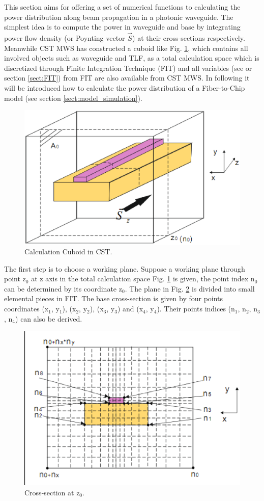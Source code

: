 
This section aims for offering a set of numerical functions to calculating the power distribution along beam propagation in a photonic waveguide. The simplest idea is to compute the power in waveguide and base by integrating power flow density (or Poynting vector $\vec{S}$) at their cross-sections respectively. Meanwhile CST MWS has constructed a cuboid like Fig. \ref{Afig:app_power_distribution01}, which contains all involved objects such as waveguide and TLF, as a total calculation space which is discretized through Finite Integration Technique (FIT) and all variables (see \cite{script_FeldSim} or section \ref{sect:FIT}) from FIT are also available from CST MWS. In following it will be introduced how to calculate the power distribution of a Fiber-to-Chip model (see section \ref{sect:model_simulation}). 
\begin{figure}[ht]
\centering
\includegraphics[width=0.7 \textwidth]{bilder/app_power_distribution01}
\caption{Calculation Cuboid in CST.}
\label{Afig:app_power_distribution01}
\end{figure}
The first step is to choose a working plane. Suppose a working plane through point z$_{0}$ at z axis in the total calculation space Fig. \ref{Afig:app_power_distribution01} is given, the point index n$_{0}$ can be determined by its coordinate z$_{0}$. The plane in Fig. \ref{Afig:app_power_distribution02} is divided into small elemental pieces in FIT. The base cross-section is given by four points coordinates (x$_{1}$, y$_{1}$), (x$_{2}$, y$_{2}$), (x$_{3}$, y$_{3}$) and (x$_{4}$, y$_{4}$). Their points indices (n$_{1}$, n$_{2}$, n$_{3}$, n$_{4}$) can also be derived.    
\begin{figure}[ht]
\centering
\includegraphics[width=0.7 \textwidth]{bilder/app_power_distribution02}
\caption{Cross-section at z$_{0}$.}
\label{Afig:app_power_distribution02}
\end{figure}
